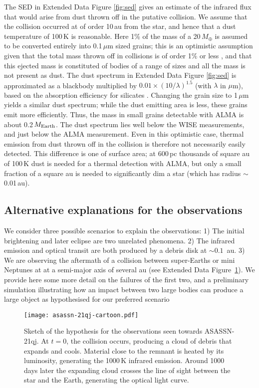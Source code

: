 \documentclass[sn-nature]{sn-jnl}%
\begin{document}
The SED in Extended Data Figure \ref{fig:sed} gives an estimate of the infrared flux that would arise from dust thrown off in the putative collision.
%
We assume that the collision occurred at of order 10\,au from the star, and hence that a dust temperature of 100\,K is reasonable.
%
Here 1\% of the mass of a 20\,$M_\oplus$ is assumed to be converted entirely into 0.1\,$\mu$m sized grains; this is an optimistic assumption given that the total mass thrown off in collisions is of order 1\% or less \citep{2012ApJ...745...79L}, and that this ejected mass is constituted of bodies of a range of sizes and all the mass is not present as dust.
%
The dust spectrum in Extended Data Figure \ref{fig:sed} is approximated as a blackbody multiplied by $0.01 \times (10 / \lambda)^{1.5}$ (with $\lambda$ in $\mu$m), based on the absorption efficiency for silicates \citep{1993ApJ...402..441L}.
%
Changing the grain size to 1\,$\mu$m yields a similar dust spectrum; while the dust emitting area is less, these grains emit more efficiently.
%
Thus, the mass in small grains detectable with ALMA is about 0.2\,$M_{\rm Earth}$.
%
The dust spectrum lies well below the WISE measurements, and just below the ALMA measurement. Even in this optimistic case, thermal emission from dust thrown off in the collision is therefore not necessarily easily detected.
%
This difference is one of surface area; at 600\,pc thousands of square au of 100\,K dust is needed for a thermal detection with ALMA, but only a small fraction of a square au is needed to significantly dim a star (which has radius $\sim$0.01\,au).

\subsection*{Alternative explanations for the observations}

We consider three possible scenarios to explain the observations: 1) The initial brightening and later eclipse are two unrelated phenomena.
%
2) The infrared emission and optical transit are both produced by a debris disk at $\sim0.1$~au.
%
3) We are observing the aftermath of a collision between super-Earths or mini Neptunes at at a semi-major axis of several au (see Extended Data Figure~\ref{fig:hypothesis}).
%
We provide here some more detail on the failures of the first two, and a preliminary simulation illustrating how an impact between two large bodies can produce a large object as hypothesised for our preferred scenario 


\begin{figure}
    \centering
    \texttt{[image: asassn-21qj-cartoon.pdf]}
    \caption{Sketch of the hypothesis for the observations seen towards ASASSN-21qj.
    At $t=0$, the collision occurs, producing a cloud of debris that expands and cools.
    Material close to the remnant is heated by its luminosity, generating the 1000\,K infrared emission.
    Around 1000 days later the expanding cloud crosses the line of sight between the star and the Earth, generating the optical light curve.}
    \label{fig:hypothesis}
\end{figure}
\end{document}

